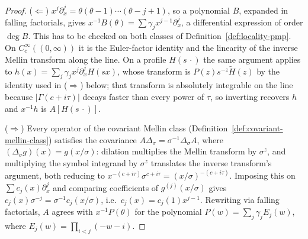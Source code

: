 \begin{proof}
($\Leftarrow$) $x^{j}\partial_x^{j} = \theta(\theta-1)\cdots(\theta - j + 1)$, so a polynomial
$B$, expanded in falling factorials, gives $x^{-1}B(\theta) = \sum \gamma_j x^{j-1}\partial_x^j$,
a differential expression of order $\deg B$. This has to be checked on both classes of
Definition~\ref{def:locality-pmp}. On $C_c^\infty((0,\infty))$ it is the Euler-factor identity
and the linearity of the inverse Mellin transform along the line. On a profile $H(s\,\cdot)$ the
same argument applies to $h(x) = \sum_j\gamma_j x^j\partial_x^j H(sx)$, whose transform is
$P(z)s^{-z}\tilde H(z)$ by the identity used in ($\Rightarrow$) below; that transform is
absolutely integrable on the line because $|\Gamma(c+i\tau)|$ decays faster than every power of
$\tau$, so inverting recovers $h$ and $x^{-1}h$ is $A[H(s\,\cdot)]$.

($\Rightarrow$) Every operator of the covariant Mellin class
(Definition~\ref{def:covariant-mellin-class}) satisfies the covariance
$A\Delta_\sigma = \sigma^{-1}\Delta_\sigma A$, where
$(\Delta_\sigma g)(x) = g(x/\sigma)$: dilation multiplies the Mellin transform by $\sigma^{z}$,
and multiplying the symbol integrand by $\sigma^{z}$ translates the inverse transform's
argument, both reducing to $x^{-(c+i\tau)}\sigma^{c+i\tau} = (x/\sigma)^{-(c+i\tau)}$.
Imposing this on $\sum c_j(x)\partial_x^j$ and comparing coefficients of $g^{(j)}(x/\sigma)$
gives $c_j(x)\sigma^{-j} = \sigma^{-1}c_j(x/\sigma)$, i.e.\ $c_j(x) = c_j(1)x^{j-1}$.
Rewriting via falling factorials, $A$ agrees with $x^{-1}P(\theta)$ for the polynomial
$P(w) = \sum_j \gamma_j E_j(w)$, where $E_j(w) = \prod_{i<j}(-w-i)$.


\end{proof}
